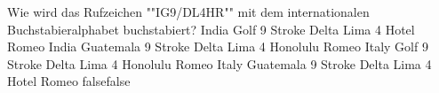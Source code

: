     {Wie wird das Rufzeichen ""IG9/DL4HR"" mit dem internationalen Buchstabieralphabet  buchstabiert?}
    {India Golf 9 Stroke Delta Lima 4 Hotel Romeo}
    {India Guatemala 9 Stroke Delta Lima 4 Honolulu Romeo}
    {Italy Golf 9 Stroke Delta Lima 4 Honolulu Romeo}
    {Italy Guatemala 9 Stroke Delta Lima 4 Hotel Romeo}
    {false}{false}